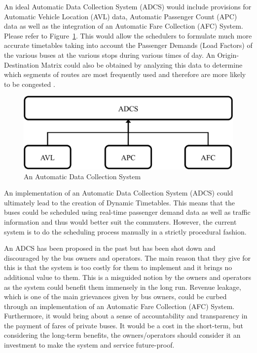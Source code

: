 An ideal Automatic Data Collection System (ADCS) would include provisions for Automatic Vehicle Location (AVL) data, Automatic Passenger Count (APC) data as well as the integration of an Automatic Fare Collection (AFC) System. Please refer to Figure~\ref{image-ADCS}. This would allow the schedulers to formulate much more accurate timetables taking into account the Passenger Demands (Load Factors) of the various buses at the various stops during various times of day. An Origin-Destination Matrix could also be obtained by analyzing this data to determine which segments of routes are most frequently used and therefore are more likely to be congested \cite{Wilson2008}.

\begin {figure} [h!]
\centering
\includegraphics[scale=0.6]{ADCS}
\caption [An Automatic Data Collection System] {An Automatic Data Collection System}
\label {image-ADCS}
\end {figure}

An implementation of an Automatic Data Collection System (ADCS) could ultimately lead to the creation of Dynamic Timetables. This means that the buses could be scheduled using real-time passenger demand data as well as traffic information and thus would better suit the commuters. However, the current system is to do the scheduling process manually in a strictly procedural fashion.

An ADCS has been proposed in the past but has been shot down and discouraged by the bus owners and operators. The main reason that they give for this is that the system is too costly for them to implement and it brings no additional value to them. This is a misguided notion by the owners and operators as the system could benefit them immensely in the long run. Revenue leakage, which is one of the main grievances given by bus owners, could be curbed through an implementation of an Automatic Fare Collection (AFC) System. Furthermore, it would bring about a sense of accountability and transparency in the payment of fares of private buses. It would be a cost in the short-term, but considering the long-term benefits, the owners/operators should consider it an investment to make the system and service future-proof.

